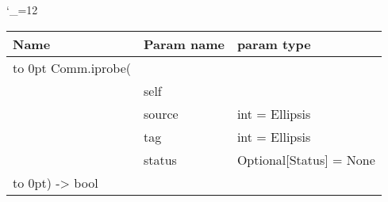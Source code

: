 \begingroup \catcode`\_=12 \tt
\begin{tabular}{lll}
\toprule
\textrm{Name}&\textrm{Param name}&\textrm{param type}\\
\midrule
\hbox to 0pt {Comm.iprobe(\hss}\\
& self\\
& source & int = Ellipsis\\
& tag & int = Ellipsis\\
& status & Optional[Status] = None\\
\hbox to 0pt{) -> bool\hss}\\
\bottomrule
\end{tabular}
\endgroup
